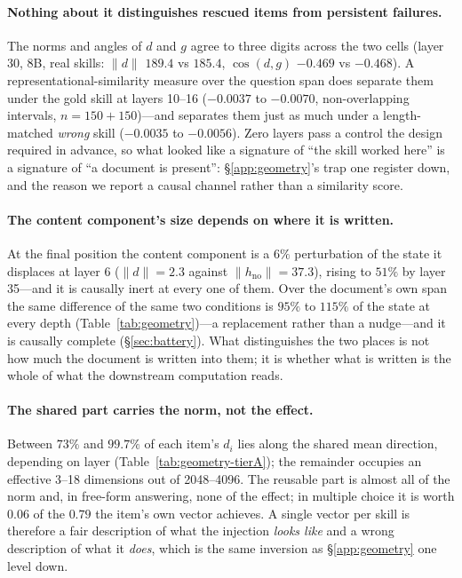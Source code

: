 \documentclass{article}
\newcommand{\dvec}{\ensuremath{d}}
\newcommand{\gvec}{\ensuremath{g}}
\begin{document}
\paragraph{Nothing about it distinguishes rescued items from persistent
failures.} The norms and angles of $\dvec$ and $\gvec$ agree to three digits
across the two cells (layer 30, 8B, real skills: $\|\dvec\|$ $189.4$ vs $185.4$,
$\cos(\dvec,\gvec)$ $-0.469$ vs $-0.468$). A representational-similarity measure
over the question span does separate them under the gold skill at layers 10--16
($-0.0037$ to $-0.0070$, non-overlapping intervals, $n=150+150$)---and separates
them just as much under a length-matched \emph{wrong} skill ($-0.0035$ to
$-0.0056$). Zero layers pass a control the design required in advance, so what
looked like a signature of ``the skill worked here'' is a signature of ``a
document is present'': \S\ref{app:geometry}'s trap one register down, and the
reason we report a causal channel rather than a similarity score.

\paragraph{The content component's size depends on where it is written.} At the
final position the content component is a $6\%$ perturbation of the state it
displaces at layer 6 ($\|\dvec\|=2.3$ against $\|h_{\text{no}}\|=37.3$), rising
to $51\%$ by layer 35---and it is causally inert at every one of them. Over the
document's own span the same difference of the same two conditions is $95\%$ to
$115\%$ of the state at every depth (Table~\ref{tab:geometry})---a replacement
rather than a nudge---and it is causally complete (\S\ref{sec:battery}). What
distinguishes the two places is not how much the document is written into them;
it is whether what is written is the whole of what the downstream computation
reads.

\paragraph{The shared part carries the norm, not the effect.} Between $73\%$ and $99.7\%$ of each item's
$\dvec_i$ lies along the shared mean direction, depending on layer
(Table~\ref{tab:geometry-tierA}); the remainder occupies an effective 3--18 dimensions
out of 2048--4096. The reusable part is almost all of the norm and, in free-form
answering, none of the effect; in multiple choice it is worth $0.06$ of the
$0.79$ the item's own vector achieves. A single vector per skill is therefore a
fair description of
what the injection \emph{looks like} and a wrong description of what it
\emph{does}, which is the same inversion as \S\ref{app:geometry} one level
down.
\end{document}
